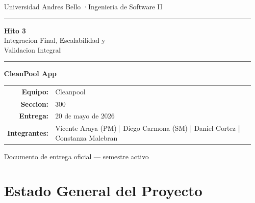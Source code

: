 \documentclass[11pt, a4paper]{article}
\newcommand{\nombreequipo}{Cleanpool}
\newcommand{\nombreproyecto}{CleanPool App}
\newcommand{\integrantes}{%
  Vicente Araya (PM) \quad|\quad
  Diego Carmona (SM) \quad|\quad
  Daniel Cortez \quad|\quad
  Constanza Malebran
}
\newcommand{\seccion}{300}
\newcommand{\fechaentrega}{20 de mayo de 2026}
\begin{document}
\thispagestyle{empty}
\begin{center}
  \vspace*{1.5cm}

  {\small\color{gray} Universidad Andres Bello \quad·\quad Ingenieria de Software II}

  \vspace{1cm}
  \textcolor{primary}{\rule{\linewidth}{1.5pt}}
  \vspace{0.4cm}

  {\Huge\bfseries\color{primary} Hito 3}\\[0.5em]
  {\LARGE Integracion Final, Escalabilidad y}\\
  {\LARGE Validacion Integral}

  \vspace{0.4cm}
  \textcolor{primary}{\rule{\linewidth}{1.5pt}}
  \vspace{1.2cm}

  {\Large\bfseries \nombreproyecto}

  \vspace{1cm}
  \begin{tabular}{rl}
    \textbf{Equipo:}      & \nombreequipo \\[4pt]
    \textbf{Seccion:}     & \seccion \\[4pt]
    \textbf{Entrega:}     & \fechaentrega \\[4pt]
    \textbf{Integrantes:} & \parbox[t]{9cm}{\integrantes}
  \end{tabular}

  \vfill
  {\small\color{gray} Documento de entrega oficial — semestre activo}
\end{center}

\newpage

\tableofcontents
\newpage

\section{Estado General del Proyecto}
\end{document}
